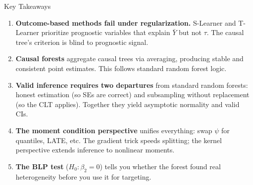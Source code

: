 \documentclass[aspectratio=169, 11pt, handout]{beamer}
\begin{document}
\begin{frame}{Key Takeaways}
 
\begin{enumerate}
    \item \textbf{Outcome-based methods fail under regularization.} S-Learner and T-Learner prioritize prognostic variables that explain $\bar{Y}$ but not $\tau$. The causal tree's criterion is blind to prognostic signal.
 
    \pause
    \smallskip
 
    \item \textbf{Causal forests} aggregate causal trees via averaging, producing stable and consistent point estimates. This follows standard random forest logic.
 
    \pause
    \smallskip
 
    \item \textbf{Valid inference requires two departures} from standard random forests: honest estimation (so SEs are correct) and subsampling without replacement (so the CLT applies). Together they yield asymptotic normality and valid CIs.
 
    \pause
    \smallskip
 
    \item \textbf{The moment condition perspective} unifies everything: swap $\psi$ for quantiles, LATE, etc. The gradient trick speeds splitting; the kernel perspective extends inference to nonlinear moments.
 
    \pause
    \smallskip
 
    \item \textbf{The BLP test} ($H_0: \beta_2 = 0$) tells you whether the forest found real heterogeneity before you use it for targeting.
\end{enumerate}
 
\end{frame}
 
\end{document}
